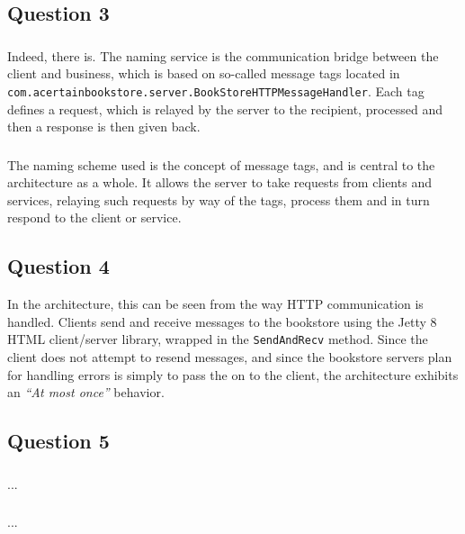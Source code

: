\subsection{Question 3}

\subsubsection{}
Indeed, there is. The naming service is the communication bridge between the
client and business, which is based on so-called message tags located in \\
{\tt com.acertainbookstore.server.BookStoreHTTPMessageHandler}. Each tag defines
a request, which is relayed by the server to the recipient, processed and then
a response is then given back.

\subsubsection{}
The naming scheme used is the concept of message tags, and is central to the
architecture as a whole. It allows the server to take requests from clients and
services, relaying such requests by way of the tags, process them and in turn
respond to the client or service.

\subsection{Question 4}
In the architecture, this can be seen from the way HTTP communication is handled. Clients send and receive messages to the bookstore using the Jetty 8 HTML client/server library, wrapped in the {\tt SendAndRecv} method. Since the client does not attempt to resend messages, and since the bookstore servers plan for handling errors is simply to pass the on to the client, the architecture exhibits an {\it ``At most once''} behavior.

\subsection{Question 5}

\subsubsection{}
...

\subsubsection{}
...

